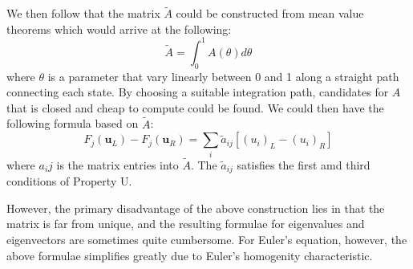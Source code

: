\documentclass[a4paper]{article}
\numberwithin{equation}{section}
\begin{document}
We then follow that the matrix $\tilde{A}$ could be constructed from mean value theorems which would arrive at the following:
\begin{equation}
    \tilde{A} = \int_0^1 A(\theta) d \theta
\end{equation}
where $\theta$ is a parameter that vary linearly between 0 and 1 along a straight path connecting each state. By choosing a suitable integration path, candidates for $A$ that is closed and cheap to compute could be found. We could then have the following formula based on $\tilde{A}$:
\begin{equation} \label{Roe's Integral}
    F_j(\mathbf{u}_L) - F_j(\mathbf{u}_R) = \sum_i \tilde{a}_{ij} \left[(u_i)_L - (u_i)_R\right]
\end{equation} 
where $a_ij$ is the matrix entries into $\tilde{A}$. The $\tilde{a}_{ij}$ satisfies the first amd third conditions of Property U.

However, the primary disadvantage of the above construction lies in that the matrix is far from unique, and the resulting formulae for eigenvalues and eigenvectors are sometimes quite cumbersome. For Euler's equation, however, the above formulae simplifies greatly due to Euler's homogenity characteristic. 
\end{document}
